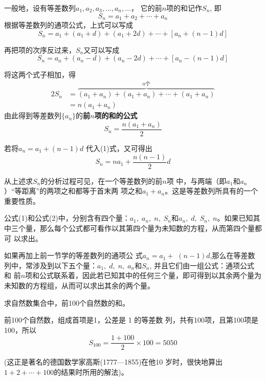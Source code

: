 一般地，设有等差数列$a_1,a_2,a_3,\ldots,a_n,\ldots$，
它的前$n$项的和记作$S_n$, 即
\[S_n=a_1+a_2+\cdots+a_n\]
根据等差数列的通项公式，上式可以写成
\[S_n=a_1+(a_1+d)+(a_1+2d)+\cdots+[a_n+(n-1)d]\]

再把项的次序反过来，$S_n$又可以写成
\[S_n=a_n+(a_n-d)+(a_n-2d)+\cdots+[a_n-(n-1)d]\]

将这两个式子相加，得
\[\begin{split}
    2S_n&=\overbrace{(a_1+a_n)+(a_1+a_n)+\cdots +(a_1+a_n)}^{n\text{个}} \\
    &=n(a_1+a_n)
\end{split}\]
由此得到等差数列$\{a_n\}$的\textbf{前$n$项的和的公式}
\begin{equation}
    S_n=\frac{n(a_1+a_n)}{2}\tag{1}
\end{equation}

若将$a_n=a_1+(n-1)d$
代入(1)式，又可得出
\begin{equation}
    S_n=na_1+\frac{n(n-1)}{2}d \tag{2}
\end{equation}

从上述求$S_n$的分析过程可见，在一个等差数列的前$n$项
中，与两端（即$a_1$和$a_n$）“等距离”的两项之和都等于首末两
项之和$a_1+a_n$。这是等差数列所具有的一个重要性质。

公式(1)和公式(2)中，分别含有四个量：$a_1,\; a_n,\;  n,\; S_n$和$a_n,\; d,\; S_n,\; n$。如果已知其中三个量，那么每个公式都可看作以其第四个量为未知数的方程，从而第四个量都可
以求出。

如果再加上前一节学的等差数列的通项公 式$a_n=a_1+$ $(n-1)d$,那么在等差数列中，常涉及到以下五个量：$a_1,\; d,\; n,\; a_n$和$S_n$, 并且它们由一组公式：通项公式 和 前$n$项和公式联系着，因此若已知其中的任何三个量，即可得到以其余两个量为未知数的方程组，从而可以求出其余的两个量。


\begin{example}
    求自然数集合中，前100个自然数的和。
\end{example}

\begin{solution}
前100个自然数，组成首项是1，公差是 1 的等差数
列，共有100项，且第100项是100，所以
$$S_{100}=\frac{1+100}2\times100=5050$$

(这正是著名的德国数学家高斯(1777—1855)在他10
岁时，很快地算出$1+2+\cdots+100$的结果时所用的解法)。 
\end{solution}

